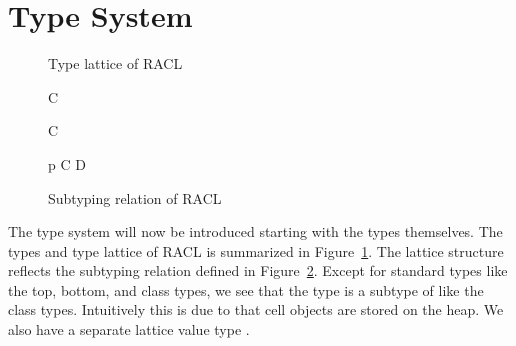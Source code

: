 \section{Type System}
\label{sec:type_system}

\begin{figure}[]
  \centering
  \caption{Type lattice of RACL}
  \label{fig:racl_typelat}
\end{figure}

\begin{figure}
  \begin{multicols}{2}

    {\tau \stof \RaclTop}

    \RuleSpace

    {\RaclBot \stof \tau}

    \RuleSpace

    {\CellType \stof \AnyRefType}

    \RuleSpace

    {C \stof \AnyRefType}

    \RuleSpace

    {\NullType \stof \CellType}
    
    \RuleSpace

    {\NullType \stof C}
  \end{multicols}

  \RuleSpace

  {p \vdash {}}
  {C \stof D}

  \caption{Subtyping relation of RACL}
  \label{fig:def_stof}
\end{figure}

The type system will now be introduced starting with the types themselves.  The
types and type lattice of RACL is summarized in Figure~\ref{fig:racl_typelat}.
The lattice structure reflects the subtyping relation defined in
Figure~\ref{fig:def_stof}.  Except for standard types like the top, bottom, and
class types, we see that the \CellType{} type is a subtype of \AnyRefType{} like
the class types. Intuitively this is due to that cell objects are stored
on the heap. We also have a separate lattice value type \LatType{}. 


